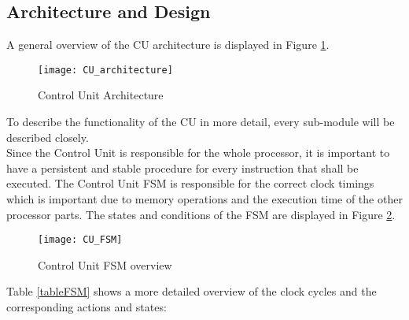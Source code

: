 \subsection{Architecture and Design}
\label{CU_arch}
A general overview of the CU architecture is displayed in Figure \ref{fig:cuarchitecture}. 

\begin{figure}[H]
	\centering
	\texttt{[image: CU\_architecture]}
	\caption{Control Unit Architecture}
	\label{fig:cuarchitecture}
\end{figure}

To describe the functionality of the CU in more detail, every sub-module will be described closely.\\
Since the Control Unit is responsible for the whole processor, it is important to have a persistent and stable procedure for every instruction that shall be executed. The Control Unit \ac{FSM} is responsible for the correct clock timings which is important due to memory operations and the execution time of the other processor parts. The states and conditions of the FSM are displayed in Figure \ref{fig:cufsm}. 

\begin{figure}[H]
	\centering
	\texttt{[image: CU\_FSM]}
	\caption{Control Unit FSM overview}
	\label{fig:cufsm}
\end{figure}

Table \ref{tableFSM} shows a more detailed overview of the clock cycles and the corresponding actions and states:\\

\begin{table}[h]
\setlength\arrayrulewidth{2pt}	
\caption{Timing of FSM}
\label{tableFSM}
\end{table}

